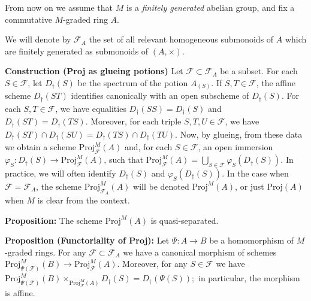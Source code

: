 \documentclass[graybox]{svmult}
\begin{document}
From now on we assume that $M$ is a \emph{finitely generated} abelian group, and fix a commutative $M$-graded ring $A$.

We will denote by $\mathcal{F}_A$ the set of all relevant homogeneous submonoids of $A$ which are finitely generated as submonoids of $(A,\times)$.

\vspace{0.25\baselineskip}
\noindent
\textbf{{Construction (Proj as glueing potions)}}
Let
$\mathcal{F} \subset \mathcal{F}_A$ be a subset.
 For each $S \in \mathcal{F}$, let $D_{\dagger}(S)$ be the spectrum of the potion $A_{(S)}$. 
 If $S,T \in \mathcal{F}$, the affine scheme $D_{\dagger}(ST)$ identifies canonically with an open subscheme of $D_{\dagger}(S)$. For each $S,T \in \mathcal{F}$, we have equalities
$
 D_{\dagger}({S S}) = D_{\dagger}(S) $ and $ D_{\dagger}({ST})=D_{\dagger}({TS}).
$
 Moreover, for each triple $S,T,U \in \mathcal{F}$, we have
$
 D_{\dagger}({ST} )\cap D_{\dagger}({SU}) = D_{\dagger}({TS}) \cap D_{\dagger}({TU}).
$
Now, by glueing, from these data we obtain a scheme $\mathrm{Proj}^M_{\mathcal{F} } (A)$ and, for each $S \in \mathcal{F}$, an open immersion $\varphi_S : D_{\dagger}(S) \to \mathrm{Proj}^M_{\mathcal{F}} (A)$, such that
$
\mathrm{Proj}^M_{\mathcal{F} } (A) = \bigcup_{S \in \mathcal{F} } \varphi_S( D_{\dagger}(S)).
$
In practice, we will often identify $D_{\dagger}(S) $ and $\varphi_S (D_{\dagger}(S))$. 
In the case when $\mathcal{F} = \mathcal{F}_A$,
 the scheme $\mathrm{Proj}^M_{\mathcal{F}_A} (A)$ will be denoted $\mathrm{Proj}^M(A)$, or just $\mathrm{Proj}( A)$ when $M$ is clear from the context.






\vspace{0.25\baselineskip}
\noindent
\textbf{{Proposition:}}
The scheme $\mathrm{Proj}^M(A)$ is quasi-separated.



\vspace{0.25\baselineskip}
\noindent
{\textbf{Proposition (Functoriality of Proj):}} 
Let $\Psi:A \to B $ be a homomorphism of $M$-graded rings. 
For any $\mathcal{F} \subset \mathcal{F}_A$ 
we have a canonical morphism of schemes $\mathrm{Proj}^M_{\Psi (\mathcal{F})} (B) \to \mathrm{Proj}^M_{\mathcal{F} } (A)$. Moreover, for any $S \in \mathcal{F}$ we have
$\mathrm{Proj}^M_{\Psi(\mathcal{F})}(B) \times_{\mathrm{Proj}_{\mathcal{F}}^M(A)} D_\dag(S) = D_\dag(\Psi(S));$
in particular, the morphism is affine.
\end{document}
